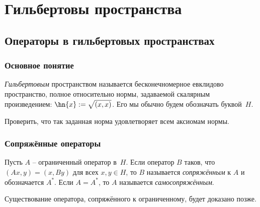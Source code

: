\documentclass[a4paper]{article}
\begin{document}
\dmvntrail


\pagebreak
\pagestyle{headings}

\makeatletter
  \renewcommand{\headheight}{11mm}
  \renewcommand{\headsep}{2mm}
  \renewcommand{\sectionmark}[1]{}
  \renewcommand{\subsectionmark}[1]{}
  \renewcommand{\subsubsectionmark}[1]{\markright{\thesubsubsection. #1}}
  \renewcommand{\@oddhead}{\vbox{\hbox to \textwidth{\scriptsize\thepage\hfil\rightmark\strut}\hrule}}
  \renewcommand{\@oddfoot}{\hfil\thepage\hfil}
\makeatother




\section{Гильбертовы пространства}

\subsection{Операторы в гильбертовых пространствах}

\subsubsection{Основное понятие}

\begin{df}
\emph{Гильбертовым} пространством называется бесконечномерное евклидово пространство, полное относительно нормы,
задаваемой скалярным произведением: $\hn{x} := \sqrt{(x,x)}$. Его мы обычно будем обозначать
буквой~$H$.
\end{df}

\begin{problem}
Проверить, что так заданная норма удовлетворяет всем аксиомам нормы.
\end{problem}

\subsubsection{Сопряжённые операторы}

\begin{df}
Пусть $A$ -- ограниченный оператор в~$H$.
Если оператор $B$ таков, что $(Ax,y) = (x,By)$ для всех $x,y\in H$, то $B$ называется \emph{сопряжённым} к $A$
и обозначается $A^*$. Если $A = A^*$, то $A$ называется \emph{самосопряжённым}.
\end{df}

\begin{note}
Существование оператора, сопряжённого к ограниченному, будет доказано позже.
\end{note}
\end{document}
